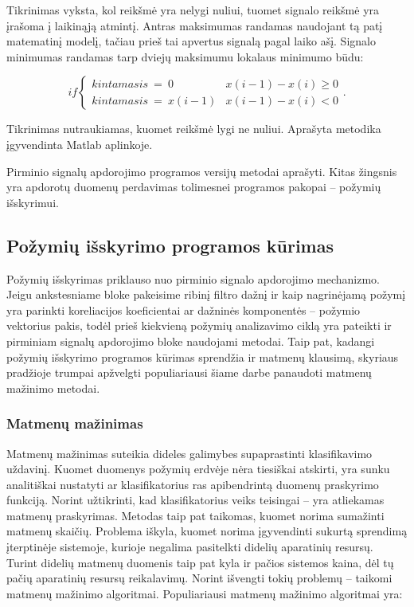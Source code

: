 \documentclass[]{vgtuef}
\begin{document}
Tikrinimas vyksta, kol reikšmė yra nelygi nuliui, tuomet signalo reikšmė yra įrašoma į laikinąją atmintį. Antras maksimumas randamas naudojant tą patį matematinį modelį, tačiau prieš tai apvertus signalą pagal laiko ašį. Signalo minimumas randamas tarp dviejų maksimumu lokalaus minimumo būdu:

\begin{equation}
	if \left\{ \begin{array}{ll}
	kintamasis~=~0 & x(i-1) - x(i) \geq 0 \\
	kintamasis~=~x(i-1) & x(i-1) - x(i) < 0 
	\end{array} \right..
\end{equation}

Tikrinimas nutraukiamas, kuomet reikšmė lygi ne nuliui. Aprašyta metodika įgyvendinta Matlab aplinkoje.

Pirminio signalų apdorojimo programos versijų metodai aprašyti. Kitas žingsnis yra apdorotų duomenų perdavimas tolimesnei programos pakopai -- požymių išskyrimui.

\subsection{Požymių išskyrimo programos kūrimas}

Požymių išskyrimas priklauso nuo pirminio signalo apdorojimo mechanizmo. Jeigu ankstesniame bloke pakeisime ribinį filtro dažnį ir kaip nagrinėjamą požymį yra parinkti koreliacijos koeficientai ar dažninės komponentės -- požymio vektorius pakis, todėl prieš kiekvieną požymių analizavimo ciklą yra pateikti ir pirminiam signalų apdorojimo bloke naudojami metodai. Taip pat, kadangi požymių išskyrimo programos kūrimas sprendžia ir matmenų klausimą, skyriaus pradžioje trumpai apžvelgti populiariausi šiame darbe panaudoti matmenų mažinimo metodai.

\subsubsection{Matmenų mažinimas}

Matmenų mažinimas suteikia dideles galimybes supaprastinti klasifikavimo uždavinį. Kuomet duomenys požymių erdvėje nėra tiesiškai atskirti, yra sunku analitiškai nustatyti ar klasifikatorius ras apibendrintą duomenų praskyrimo funkciją. Norint užtikrinti, kad klasifikatorius veiks teisingai -- yra atliekamas matmenų praskyrimas. Metodas taip pat taikomas, kuomet norima sumažinti matmenų skaičių. Problema iškyla, kuomet norima įgyvendinti sukurtą sprendimą įterptinėje sistemoje, kurioje negalima pasitelkti didelių aparatinių resursų. Turint didelių matmenų duomenis taip pat kyla ir pačios sistemos kaina, dėl tų pačių aparatinių resursų reikalavimų. Norint išvengti tokių problemų -- taikomi matmenų mažinimo algoritmai. Populiariausi matmenų mažinimo algoritmai yra:
\end{document}
